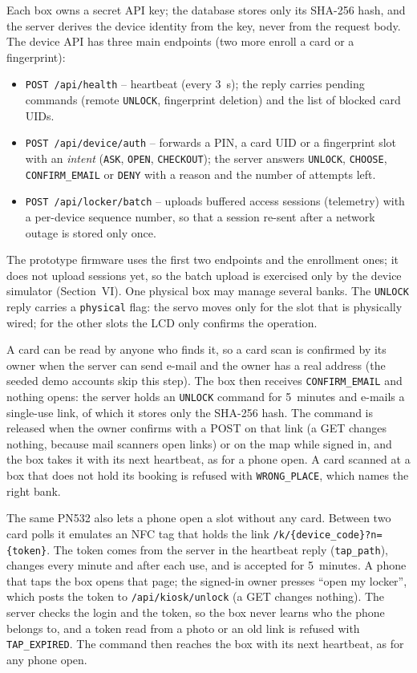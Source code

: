 \documentclass[conference, onecolumn]{IEEEtran}
\begin{document}
Each box owns a secret API key; the database stores only its SHA-256 hash, and the server derives the device identity
from the key, never from the request body. The device API has three main endpoints (two more enroll a card or a
fingerprint):
\begin{itemize}
  \item \texttt{POST /api/health} -- heartbeat (every 3~s); the reply carries pending commands (remote \texttt{UNLOCK},
        fingerprint deletion) and the list of blocked card UIDs.
  \item \texttt{POST /api/device/auth} -- forwards a PIN, a card UID or a fingerprint slot with an \emph{intent}
        (\texttt{ASK}, \texttt{OPEN}, \texttt{CHECKOUT}); the server answers \texttt{UNLOCK}, \texttt{CHOOSE},
        \texttt{CONFIRM\_EMAIL} or \texttt{DENY} with a reason and the number of attempts left.
  \item \texttt{POST /api/locker/batch} -- uploads buffered access sessions (telemetry) with a per-device sequence
        number, so that a session re-sent after a network outage is stored only once.
\end{itemize}
The prototype firmware uses the first two endpoints and the enrollment ones; it does not upload sessions yet, so the
batch upload is exercised only by the device simulator (Section~VI).
One physical box may manage several banks. The \texttt{UNLOCK} reply carries a \texttt{physical} flag: the servo moves
only for the slot that is physically wired; for the other slots the LCD only confirms the operation.

A card can be read by anyone who finds it, so a card scan is confirmed by its owner when the server can send e-mail
and the owner has a real address (the seeded demo accounts skip this step). The box then receives
\texttt{CONFIRM\_EMAIL} and nothing opens: the server holds an \texttt{UNLOCK} command for 5~minutes and e-mails a
single-use link, of which it stores only the SHA-256 hash. The command is released when the owner confirms with a POST
on that link (a GET changes nothing, because mail scanners open links) or on the map while signed in, and the box takes
it with its next heartbeat, as for a phone open. A card scanned at a box that does not hold its booking is refused
with \texttt{WRONG\_PLACE}, which names the right bank.

The same PN532 also lets a phone open a slot without any card. Between two card polls it emulates an NFC tag that holds
the link \texttt{/k/\{device\_code\}?n=\{token\}}. The token comes from the server in the heartbeat reply
(\texttt{tap\_path}), changes every minute and after each use, and is accepted for 5~minutes. A phone that taps the box
opens that page; the signed-in owner presses ``open my locker'', which posts the token to \texttt{/api/kiosk/unlock}
(a GET changes nothing). The server checks the login and the token, so the box never learns who the phone belongs to,
and a token read from a photo or an old link is refused with \texttt{TAP\_EXPIRED}. The command then reaches the box
with its next heartbeat, as for any phone open.
\end{document}
